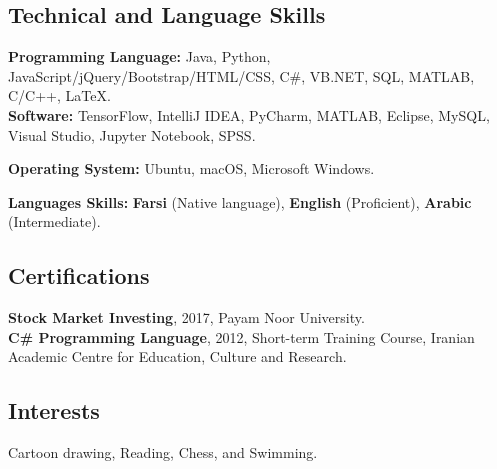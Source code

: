 \documentclass[10pt]{article}
\begin{document}
\subsection*{Technical and Language Skills}

\noindent \textbf{Programming Language:}  Java, Python,  JavaScript/jQuery/Bootstrap/HTML/CSS, C\#, VB.NET, SQL, MATLAB, C/C++, \LaTeX.\\
\noindent \textbf{Software:} TensorFlow, IntelliJ IDEA, PyCharm, MATLAB, Eclipse, MySQL, Visual Studio, Jupyter Notebook, SPSS.

\noindent \textbf{Operating System:} Ubuntu, macOS, Microsoft Windows.

\noindent \textbf{Languages Skills: }\textbf {Farsi} (Native language), \textbf {English} (Proficient), \textbf {Arabic} (Intermediate).

\subsection*{Certifications}
\noindent \textbf{Stock Market Investing}, 2017, Payam Noor University.\\
\noindent \textbf{C\# Programming Language}, 2012, Short-term Training Course, Iranian Academic Centre for Education, Culture and Research.

\subsection*{Interests}
Cartoon drawing, Reading, Chess, and Swimming.
\end{document}
